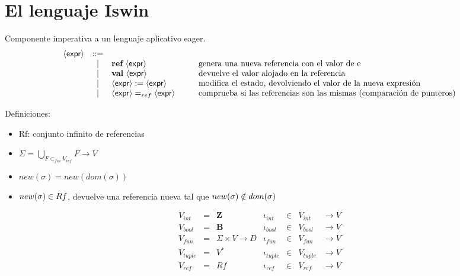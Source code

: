 \section{El lenguaje Iswin}
  \PN Componente imperativa a un lenguaje aplicativo eager.
  \[\begin{array}{rcl@{\hspace{1cm}}l}
    \expr &::=&  \\
      &|& \textbf{ref} \ \expr & \text{genera una nueva referencia con el valor de e} \\
      &|& \textbf{val} \ \expr & \text{devuelve el valor alojado en la referencia} \\
      &|& \expr := \expr & \text{modifica el estado, devolviendo el valor de la nueva expresión} \\
      &|& \expr =_{ref} \expr & \text{comprueba si las referencias son las mismas (comparación de punteros)}
  \end{array}\]

  \pagebreak
  \PN Definiciones:
  \begin{itemize}
    \item Rf: conjunto infinito de referencias
    \item $\Sigma = \bigcup\limits_{F \subset_{fin} V_{ref}} F \to V$
    \item $new(\sigma) = new(dom(\sigma))$
    \item $new(\sigma) \in Rf$, devuelve una referencia nueva tal que $new(\sigma) \notin dom(\sigma)$
  \end{itemize}

  \vspace{3mm}
  \[\begin{array}{lllllll}
    V_{int} &=& \mathbf{Z} & \iota_{int} &\in& V_{int} & \rightarrow V \\
    V_{bool} &=& \mathbf{B} & \iota_{bool} &\in& V_{bool} & \rightarrow V \\
    V_{fun} &=& \Sigma \times V \rightarrow D & \iota_{fun} &\in& V_{fun} & \rightarrow V \\
    V_{tuple} &=& V^{\ast} & \iota_{tuple} &\in& V_{tuple} & \rightarrow V \\
    V_{ref} &=& Rf & \iota_{ref} &\in& V_{ref} & \rightarrow V
  \end{array}\]

